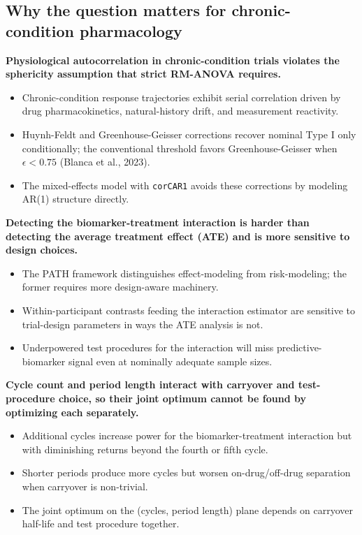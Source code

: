 \documentclass[
  11pt,
]{article}
\begin{document}
\subsection{Why the question matters for chronic-condition pharmacology}\label{why-the-question-matters-for-chronic-condition-pharmacology}

\textbf{Physiological autocorrelation in chronic-condition trials violates the sphericity assumption that strict RM-ANOVA requires.}

\begin{itemize}\setlength{\itemsep}{2pt}\setlength{\parskip}{0pt}
\item Chronic-condition response trajectories exhibit serial correlation driven by drug pharmacokinetics, natural-history drift, and measurement reactivity.
\item Huynh-Feldt and Greenhouse-Geisser corrections recover nominal Type I only conditionally; the conventional threshold favors Greenhouse-Geisser when $\epsilon < 0.75$ (Blanca et al., 2023).
\item The mixed-effects model with \texttt{corCAR1} avoids these corrections by modeling AR(1) structure directly.
\end{itemize}

\textbf{Detecting the biomarker-treatment interaction is harder than detecting the average treatment effect (ATE) and is more sensitive to design choices.}

\begin{itemize}\setlength{\itemsep}{2pt}\setlength{\parskip}{0pt}
\item The PATH framework distinguishes effect-modeling from risk-modeling; the former requires more design-aware machinery.
\item Within-participant contrasts feeding the interaction estimator are sensitive to trial-design parameters in ways the ATE analysis is not.
\item Underpowered test procedures for the interaction will miss predictive-biomarker signal even at nominally adequate sample sizes.
\end{itemize}

\textbf{Cycle count and period length interact with carryover and test-procedure choice, so their joint optimum cannot be found by optimizing each separately.}

\begin{itemize}\setlength{\itemsep}{2pt}\setlength{\parskip}{0pt}
\item Additional cycles increase power for the biomarker-treatment interaction but with diminishing returns beyond the fourth or fifth cycle.
\item Shorter periods produce more cycles but worsen on-drug/off-drug separation when carryover is non-trivial.
\item The joint optimum on the (cycles, period length) plane depends on carryover half-life and test procedure together.
\end{itemize}
\end{document}
